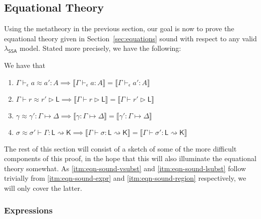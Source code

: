\documentclass[acmsmall,screen,review]{acmart}
\newcommand{\ms}[1]{\ensuremath{\mathsf{#1}}}
\newcommand{\hasty}[4]{#1 \vdash_{#2} #3: {#4}}
\newcommand{\haslb}[3]{#1 \vdash #2 \rhd #3}
\newcommand{\issubst}[3]{#1: #2 \mapsto #3}
\newcommand{\lbsubst}[4]{#1 \vdash #2: #3 \rightsquigarrow #4}
\newcommand{\teqv}{\approx}
\newcommand{\tmeq}[5]{#1 \vdash_{#2} #3 \teqv #4 : {#5}}
\newcommand{\lbeq}[4]{#1 \vdash #2 \teqv #3 \rhd {#4}}
\newcommand{\tmseq}[4]{\issubst{#1 \teqv #2}{#3}{#4}}
\newcommand{\lbseq}[5]{\lbsubst{#1 \teqv #2}{#3}{#4}{#5}}
\newcommand{\dnt}[1]{\llbracket{#1}\rrbracket}
\newcommand{\isotopessa}{\(\lambda_{\ms{SSA}}\)}
\begin{document}
\subsection{Equational Theory}

Using the metatheory in the previous section, our goal is now to prove the equational theory given
in Section~\ref{sec:equations} sound with respect to any valid \isotopessa{} model. Stated more
precisely, we have the following:
\begin{theorem}
  We have that
  \begin{enumerate}[label=(\alph*)]
    \item $\tmeq{\Gamma}{\epsilon}{a}{a'}{A} \implies 
      \dnt{\hasty{\Gamma}{\epsilon}{a}{A}} = \dnt{\hasty{\Gamma}{\epsilon}{a'}{A}}$
      \label{itm:eqn-sound-expr}
    \item $\lbeq{\Gamma}{r}{r'}{\ms{L}} \implies
      \dnt{\haslb{\Gamma}{r}{\ms{L}}} = \dnt{\haslb{\Gamma}{r'}{\ms{L}}}$
      \label{itm:eqn-sound-region}
    \item $\tmseq{\gamma}{\gamma'}{\Gamma}{\Delta} \implies
      \dnt{\issubst{\gamma}{\Gamma}{\Delta}} = \dnt{\issubst{\gamma'}{\Gamma}{\Delta}}$
      \label{itm:eqn-sound-vsubst}
    \item $\lbseq{\sigma}{\sigma'}{\Gamma}{\ms{L}}{\ms{K}} \implies
      \dnt{\lbsubst{\Gamma}{\sigma}{\ms{L}}{\ms{K}}} 
      = \dnt{\lbsubst{\Gamma}{\sigma'}{\ms{L}}{\ms{K}}}$ 
      \label{itm:eqn-sound-lsubst}
  \end{enumerate}
\end{theorem}
The rest of this section will consist of a sketch of some of the more difficult components of this
proof, in the hope that this will also illuminate the equational theory somewhat. As
\ref{itm:eqn-sound-vsubst} and \ref{itm:eqn-sound-lsubst} follow trivially from
\ref{itm:eqn-sound-expr} and \ref{itm:eqn-sound-region} respectively, we will only cover the latter.

\subsubsection{Expressions}
\end{document}
